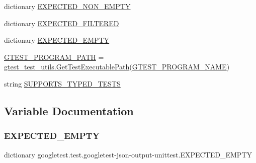 \begin{DoxyCompactItemize}
\item 
dictionary \mbox{\hyperlink{namespacegoogletest_1_1test_1_1googletest-json-output-unittest_aa56bcb98558480493ca3593b7c0e2843}{E\+X\+P\+E\+C\+T\+E\+D\+\_\+\+N\+O\+N\+\_\+\+E\+M\+P\+TY}}
\item 
dictionary \mbox{\hyperlink{namespacegoogletest_1_1test_1_1googletest-json-output-unittest_ab193fa2e92104f04e4ebb6bd9f5912ea}{E\+X\+P\+E\+C\+T\+E\+D\+\_\+\+F\+I\+L\+T\+E\+R\+ED}}
\item 
dictionary \mbox{\hyperlink{namespacegoogletest_1_1test_1_1googletest-json-output-unittest_aa370614677a95cc9bc4a85aa41069194}{E\+X\+P\+E\+C\+T\+E\+D\+\_\+\+E\+M\+P\+TY}}
\item 
\mbox{\hyperlink{namespacegoogletest_1_1test_1_1googletest-json-output-unittest_a9f50be43278852d7864f50dfe2c8e94d}{G\+T\+E\+S\+T\+\_\+\+P\+R\+O\+G\+R\+A\+M\+\_\+\+P\+A\+TH}} = \mbox{\hyperlink{namespacegoogletest_1_1test_1_1gtest__test__utils_ac9af888c702350aac56b154a6af34098}{gtest\+\_\+test\+\_\+utils.\+Get\+Test\+Executable\+Path}}(\mbox{\hyperlink{namespacegoogletest_1_1test_1_1googletest-json-output-unittest_ab1bd944e9241f41fa7c815fa8aed09e4}{G\+T\+E\+S\+T\+\_\+\+P\+R\+O\+G\+R\+A\+M\+\_\+\+N\+A\+ME}})
\item 
string \mbox{\hyperlink{namespacegoogletest_1_1test_1_1googletest-json-output-unittest_a07cad5bceb4130d489bec5e276555b19}{S\+U\+P\+P\+O\+R\+T\+S\+\_\+\+T\+Y\+P\+E\+D\+\_\+\+T\+E\+S\+TS}}
\end{DoxyCompactItemize}


\subsection{Variable Documentation}
\mbox{\label{namespacegoogletest_1_1test_1_1googletest-json-output-unittest_aa370614677a95cc9bc4a85aa41069194}} 
\subsubsection{\texorpdfstring{EXPECTED\_EMPTY}{EXPECTED\_EMPTY}}
{\footnotesize\ttfamily dictionary googletest.\+test.\+googletest-\/json-\/output-\/unittest.\+E\+X\+P\+E\+C\+T\+E\+D\+\_\+\+E\+M\+P\+TY}


